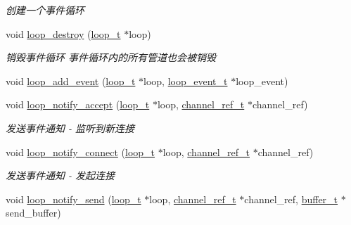 \begin{DoxyCompactItemize}
\begin{DoxyCompactList}\small\item\em 创建一个事件循环 \end{DoxyCompactList}\item 
void \hyperlink{a00104_ga921fd5e5e16a73de123e81baab187a0a_ga921fd5e5e16a73de123e81baab187a0a}{loop\+\_\+destroy} (\hyperlink{a00050_a9c3ad1cd2de83e09f3a7b59fa82c94ee_a9c3ad1cd2de83e09f3a7b59fa82c94ee}{loop\+\_\+t} $\ast$loop)
\begin{DoxyCompactList}\small\item\em 销毁事件循环 事件循环内的所有管道也会被销毁 \end{DoxyCompactList}\item 
void \hyperlink{a00068_a1697e4a52238e6e4512caac6c34b9abb_a1697e4a52238e6e4512caac6c34b9abb}{loop\+\_\+add\+\_\+event} (\hyperlink{a00050_a9c3ad1cd2de83e09f3a7b59fa82c94ee_a9c3ad1cd2de83e09f3a7b59fa82c94ee}{loop\+\_\+t} $\ast$loop, \hyperlink{a00068_a1095ee772017ce29dcac0987c456709e_a1095ee772017ce29dcac0987c456709e}{loop\+\_\+event\+\_\+t} $\ast$loop\+\_\+event)
\item 
void \hyperlink{a00068_a61e9eb6eeaaad4d1d655beba05bb8440_a61e9eb6eeaaad4d1d655beba05bb8440}{loop\+\_\+notify\+\_\+accept} (\hyperlink{a00050_a9c3ad1cd2de83e09f3a7b59fa82c94ee_a9c3ad1cd2de83e09f3a7b59fa82c94ee}{loop\+\_\+t} $\ast$loop, \hyperlink{a00050_a151271c9d188ef28d4d24bb81dcc1263_a151271c9d188ef28d4d24bb81dcc1263}{channel\+\_\+ref\+\_\+t} $\ast$channel\+\_\+ref)
\begin{DoxyCompactList}\small\item\em 发送事件通知 -\/ 监听到新连接 \end{DoxyCompactList}\item 
void \hyperlink{a00068_a32f076ad9889fd658c51d7dd0a300ed0_a32f076ad9889fd658c51d7dd0a300ed0}{loop\+\_\+notify\+\_\+connect} (\hyperlink{a00050_a9c3ad1cd2de83e09f3a7b59fa82c94ee_a9c3ad1cd2de83e09f3a7b59fa82c94ee}{loop\+\_\+t} $\ast$loop, \hyperlink{a00050_a151271c9d188ef28d4d24bb81dcc1263_a151271c9d188ef28d4d24bb81dcc1263}{channel\+\_\+ref\+\_\+t} $\ast$channel\+\_\+ref)
\begin{DoxyCompactList}\small\item\em 发送事件通知 -\/ 发起连接 \end{DoxyCompactList}\item 
void \hyperlink{a00068_ad023112870f736a601137129420a94b9_ad023112870f736a601137129420a94b9}{loop\+\_\+notify\+\_\+send} (\hyperlink{a00050_a9c3ad1cd2de83e09f3a7b59fa82c94ee_a9c3ad1cd2de83e09f3a7b59fa82c94ee}{loop\+\_\+t} $\ast$loop, \hyperlink{a00050_a151271c9d188ef28d4d24bb81dcc1263_a151271c9d188ef28d4d24bb81dcc1263}{channel\+\_\+ref\+\_\+t} $\ast$channel\+\_\+ref, \hyperlink{a00050_aad99a77d28bd81d3d36d0ea569c9482d_aad99a77d28bd81d3d36d0ea569c9482d}{buffer\+\_\+t} $\ast$send\+\_\+buffer)

\end{DoxyCompactItemize}
